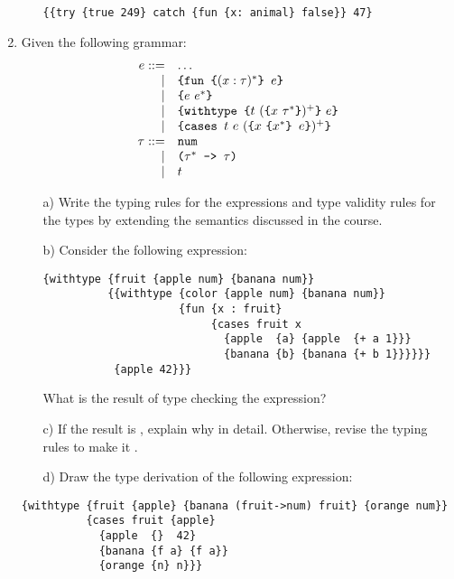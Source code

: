 \begin{enumerate}
\begin{itemize}
{
\begin{verbatim}
{{try {true 249} catch {fun {x: animal} false}} 47}
\end{verbatim}
}
\end{itemize}

\item Given the following grammar:
\[
\begin{array}{rll}
e ::= & \ldots\\
\mid& \verb+{fun {+(x:\tau)^*\verb+} +e\verb+}+\\
\mid& \verb+{+e\ e^*\verb+}+\\
\mid& \verb+{withtype {+t\ (\verb+{+x\ \tau^*\verb!}!)^+\verb+}+\ e\verb+}+\\
\mid& \verb+{cases +t\ e\ (\verb+{+x\ \verb+{+x^*\verb+} + e\verb+}+)^+\verb+}+\\
\tau ::= &\mtt{num} \\
\mid&\verb+(+\tau^*\verb+ -> +\tau\verb+)+\\
\mid&t
\end{array}
\]

\begin{itemize}
\item[a)] Write the typing rules for the expressions and type validity rules for the types
by extending the semantics discussed in the course.

\item[b)] Consider the following expression:

{
\begin{verbatim}
{withtype {fruit {apple num} {banana num}}
          {{withtype {color {apple num} {banana num}}
                     {fun {x : fruit}
                          {cases fruit x
                            {apple  {a} {apple  {+ a 1}}}
                            {banana {b} {banana {+ b 1}}}}}}
           {apple 42}}}
\end{verbatim}
}

What is the result of type checking the expression?

\item[c)] If the result is , explain why in detail.
Otherwise, revise the typing rules to make it .

\item[d)] Draw the type derivation of the following expression:
\end{itemize}

{
\begin{verbatim}
{withtype {fruit {apple} {banana (fruit->num) fruit} {orange num}}
          {cases fruit {apple}
            {apple  {}  42}
            {banana {f a} {f a}}
            {orange {n} n}}}
\end{verbatim}
}


\end{enumerate}

